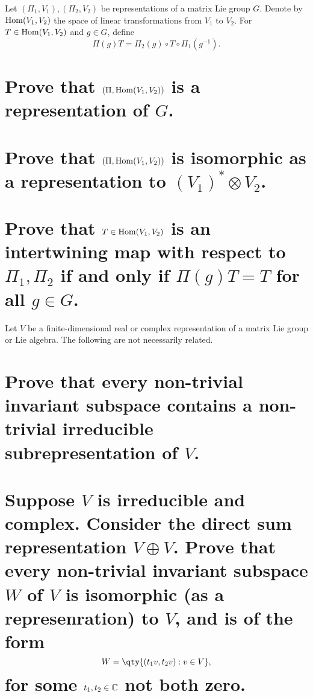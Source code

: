 \documentclass[
	pages,
	boxes,
	color=WildStrawberry
]{homework}
\begin{document}
\begin{problem}
Let $(\Pi_1, V_1), (\Pi_2, V_2)$ be representations of a matrix Lie group $G$. Denote by $\operatorname{Hom}(V_1, V_2)$ the space of linear transformations from $V_1$ to $V_2$. For $T \in \operatorname{Hom}(V_1, V_2)$ and $g \in G$, define
\[
	\Pi(g)T = \Pi_2(g) \circ T \circ \Pi_1(g^{-1}).
\]
\begin{parts}
	\part{Prove that $(\Pi, \operatorname{Hom}(V_1, V_2))$ is a representation of $G$.}
	\part{Prove that $(\Pi, \operatorname{Hom}(V_1, V_2))$ is isomorphic as a representation to $(V_1)^* \otimes V_2$.}
	\part{Prove that $T \in \operatorname{Hom}(V_1, V_2)$ is an intertwining map with respect to $\Pi_1, \Pi_2$ if and only if $\Pi(g)T = T$ for all $g \in G$.}
\end{parts}
\end{problem}

\begin{problem}
Let $V$ be a finite-dimensional real or complex representation of a matrix Lie group or Lie algebra. The following are not necessarily related.
\begin{parts}
	\part{Prove that every non-trivial invariant subspace contains a non-trivial irreducible subrepresentation of $V$.}
	\part{Suppose $V$ is irreducible and complex. Consider the direct sum representation $V \oplus V$. Prove that every non-trivial invariant subspace $W$ of $V$ is isomorphic (as a represenration) to $V$, and is of the form
		\[
			W = \qty{(t_1v, t_2v) : v \in V},
		\]
		for some $t_1, t_2 \in \mathbb{C}$ not both zero.}
\end{parts}
\end{problem}
\end{document}
